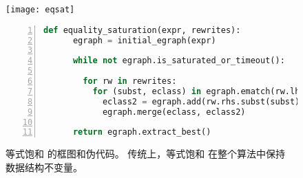


\begin{figure}
  \begin{minipage}{0.48\linewidth}
    \centering
    \texttt{[image: eqsat]}
  \end{minipage}
  \hfill
  \begin{minipage}{0.46\linewidth}
  \begin{lstlisting}[language=Python, gobble=4, numbers=left, basicstyle=\scriptsize\ttfamily]
    def equality_saturation(expr, rewrites):
      egraph = initial_egraph(expr)

      while not egraph.is_saturated_or_timeout():

        for rw in rewrites:
          for (subst, eclass) in egraph.ematch(rw.lhs):
            eclass2 = egraph.add(rw.rhs.subst(subst))
            egraph.merge(eclass, eclass2)

      return egraph.extract_best()
  \end{lstlisting}
  \end{minipage}
  \caption{
    等式饱和 的框图和伪代码。
    传统上，等式饱和 在整个算法中保持 \egraph 数据结构不变量。
  }
  \label{fig:eq-sat-bg}
\end{figure}


